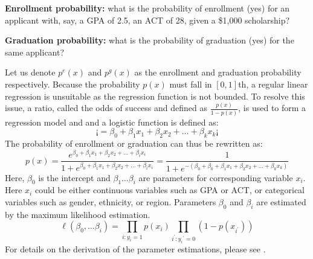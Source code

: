 \documentclass[12pt,english]{report}
\begin{document}
\noindent \textbf{Enrollment probability:} what is the probability of enrollment (yes) for an applicant with, say, a GPA of 2.5, an ACT of 28, given a \$1,000 scholarship?

\noindent \textbf{Graduation probability:} what is the probability of graduation (yes) for the same applicant?

\vspace{0.15in}
Let us denote $p^e(x)$ and $p^g(x)$ as the enrollment and graduation probability respectively. Because the probability $p(x)$ must fall in $[0,1]$th, a regular linear regression is unsuitable as the regression function is not bounded. To resolve this issue, a ratio, called the odds of success and defined as  $\frac{p(x)}{1-p(x)}$,  is used to form a regression model and and a logistic function is defined as:
\begin{equation}
\ensuremath{¡=\beta_0+\beta_1 x_1+\beta_2 x_2 +\ldots+\beta_k x_k}
¡\end{equation}
The probability of enrollment or graduation can thus be rewritten as:
\begin{equation}
p(x)=\frac{e^{\beta_0+\beta_1 x_1+\beta_2 x_2 +\ldots+\beta_i x_i}}{1+e^{\beta_0+\beta_1 x_1+\beta_2 x_2 +\ldots+\beta_ix_i}}
=\frac{1}{1+e^{-(\beta_0+\beta_0+\beta_1 x_1+\beta_2 x_2 +\ldots+\beta_k x_k)}}
\end{equation}
Here, $\beta_0$ is the intercept and $\beta_1 \ldots \beta_i$ are parameters for corresponding variable $x_i$.  Here $x_i$ could be either continuous
variables such as GPA or  ACT, or categorical variables such as gender, ethnicity, or region.  Parameters $\beta_0$ and $\beta_i$ are estimated by the maximum likelihood estimation.
\begin{equation}
\ell(\beta_0,\ldots \beta_i) = \prod_{i:y_i=1} p(x_i)
\prod_{i^{'}:y_i{^{'}=0}} (1-p(x_{i^{'}}))
\end{equation}
For details on the derivation of the parameter estimations, please see \citet{Hosmer2013}.
\end{document}
